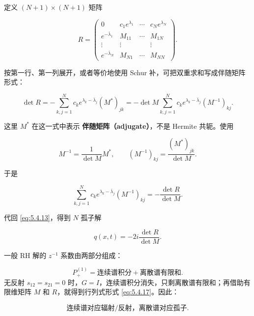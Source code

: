 \documentclass[
    lang=cn,
    scheme=chinese,
    mode=simple,
    device=normal,
    color=blue,
    math=cm,
    thmcnt=section,
    12pt
]{elegantbook}
\begin{document}
定义 $(N+1)\times(N+1)$ 矩阵

\begin{equation}
    R=
    \begin{pmatrix}
        0                  & c_1e^{\lambda_1} & \cdots & c_Ne^{\lambda_N} \\
        e^{-\bar\lambda_1} & M_{11}           & \cdots & M_{1N}           \\
        \vdots             & \vdots           &        & \vdots           \\
        e^{-\bar\lambda_N} & M_{N1}           & \cdots & M_{NN}
    \end{pmatrix}.
    \tag{5.4.14}
    \label{eq:5.4.14}
\end{equation}

按第一行、第一列展开，或者等价地使用 Schur 补，可把双重求和写成伴随矩阵形式：

\begin{equation}
    \det R
    =
    -\sum\limits_{k,j=1}^{N}
    c_ke^{\lambda_k-\bar\lambda_j}(M^*)_{jk}
    =
    -\det M
    \sum\limits_{k,j=1}^{N}
    c_ke^{\lambda_k-\bar\lambda_j}(M^{-1})_{kj}.
    \tag{5.4.15}
    \label{eq:5.4.15}
\end{equation}

这里 $M^*$ 在这一式中表示 \textbf{伴随矩阵（adjugate）}，不是 Hermite 共轭。使用

\[
    M^{-1}
    =
    \dfrac{1}{\det M}M^*,
    \qquad
    (M^{-1})_{kj}
    =
    \dfrac{(M^*)_{jk}}{\det M}.
\]

于是

\begin{equation}
    \sum\limits_{k,j=1}^{N}
    c_ke^{\lambda_k-\bar\lambda_j}(M^{-1})_{kj}
    =
    -\dfrac{\det R}{\det M}.
    \tag{5.4.16}
    \label{eq:5.4.16}
\end{equation}

代回 \eqref{eq:5.4.13}，得到 $N$ 孤子解

\begin{equation}
    \boxed{
        q(x,t)
        =
        -2i\dfrac{\det R}{\det M}.
    }
    \tag{5.4.17}
    \label{eq:5.4.17}
\end{equation}

\begin{callout}[4.2 节的核心思路]
    一般 RH 解的 $z^{-1}$ 系数由两部分组成：

    \[
        P_+^{(1)}
        =
        \text{连续谱积分}
        +
        \text{离散谱有限和}.
    \]
    无反射 $s_{12}=s_{21}=0$ 时，$G=I$，连续谱积分消失，只剩离散谱有限和；再借助有限维矩阵 $M$ 和 $R$，就得到行列式形式 \eqref{eq:5.4.17}。因此：

    \[
        \boxed{\text{连续谱对应辐射/反射，离散谱对应孤子}.}
    \]

\end{callout}
\end{document}
